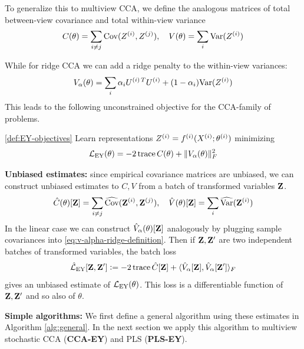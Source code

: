 To generalize this to multiview CCA, we define the analogous matrices of total between-view covariance and total within-view variance 
\begin{align}\label{eq:def-C-V-matrices}
    \vphantom{\bigl(\bigr)} %
    C(\theta) = \sum_{i \neq j} \Cov(Z\sps{i}, Z\sps{j}), \quad 
    V(\theta) = \sum_{i} \Var(Z\sps{i})
\end{align}

While for ridge CCA we can add a ridge penalty to the within-view variances:
\begin{align}\label{eq:v-alpha-ridge-definition}
    V_\alpha(\theta) = \sum_i \alpha_i {U^{(i)\,T}} U^{(i)} +  (1 - \alpha_i) \mathrm{Var}(Z^{(i)})
\end{align}
This leads to the following unconstrained objective for the CCA-family of problems.
\begin{definition}\ref{def:EY-objectives}
    Learn representations $Z^{(i)} = f^{(i)}( X^{(i)}; \theta^{(i)})$ minimizing
    \begin{align}\label{eq:EY-loss-def-C-V}
        \mathcal{L}_\text{EY}(\theta) = - 2 \operatorname{trace} C(\theta) + \lVert V_\alpha(\theta)\rVert_F^2
    \end{align}
\end{definition}

\textbf{Unbiased estimates:}
since empirical covariance matrices are unbiased, we can construct unbiased estimates to $C, V$ from a batch of transformed variables $\mathbf{Z}$.
\begin{align}\label{eq:def-C-V-matrices-empirical}
    \hat{C}(\theta)[\mathbf{Z}] = \sum_{i \neq j} \widehat{\mathrm{Cov}}(\mathbf{Z}^{(i)}, \mathbf{Z}^{(j)}), \quad 
    \hat{V}(\theta)[\mathbf{Z}] = \sum_{i} \widehat{\mathrm{Var}}(\mathbf{Z}^{(i)})
\end{align}
In the linear case we can construct $\hat{V}_\alpha(\theta)[\mathbf{Z}]$ analogously by plugging sample covariances into \cref{eq:v-alpha-ridge-definition}.
Then if $\mathbf{Z}, \mathbf{Z}'$ are two independent batches of transformed variables, the batch loss
\begin{align}\label{eq:empirical-EY-loss-estimate-def}
    \hat{\mathcal{L}}_\text{EY}[\mathbf{Z}, \mathbf{Z}'] \vcentcolon= - 2 \operatorname{trace} \hat{C}[\mathbf{Z}] + \langle \hat{V}_\alpha[\mathbf{Z}], \hat{V}_\alpha[\mathbf{Z}'] \rangle_F
\end{align}
gives an unbiased estimate of $\mathcal{L}_\text{EY}(\theta)$.%
This loss is a differentiable function of $\mathbf{Z}, \mathbf{Z}'$ and so also of $\theta$.

\textbf{Simple algorithms:}
We first define a general algorithm using these estimates in Algorithm \ref{alg:general}. In the next section we apply this algorithm to multiview stochastic CCA (\textbf{CCA-EY}) and PLS (\textbf{PLS-EY}).

